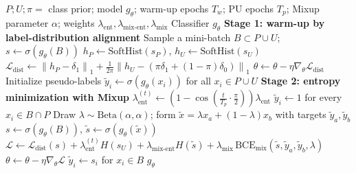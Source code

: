 \documentclass{article}
\begin{document}
\begin{algorithm}[!h]
\renewcommand{\algorithmicrequire}{\textbf{Input:}} %
\renewcommand{\algorithmicensure}{\textbf{Output:}} %
	\caption{Dist-PU (label distribution alignment for PU learning)} %
	\begin{algorithmic}[1] %
	    \REQUIRE
	    $P;U;\pi=$ class prior; model $g_{\theta}$; warm-up epochs $T_{w}$; PU epochs $T_{p}$;
	    Mixup parameter $\alpha$; weights $\lambda_{\mathrm{ent}},\lambda_{\mathrm{mix\text{-}ent}},\lambda_{\mathrm{mix}}$
	    \ENSURE
	    Classifier $g_{\theta}$
	    \STATE \textbf{Stage 1: warm-up by label-distribution alignment}
	    \STATE Sample a mini-batch $B\subset P\cup U$; $s\leftarrow \sigma(g_{\theta}(B))$ %
	    \STATE $h_{P}\leftarrow \mathrm{SoftHist}(s_{P})$, $h_{U}\leftarrow \mathrm{SoftHist}(s_{U})$ %
	    \STATE $\mathcal{L}_{\mathrm{dist}}\leftarrow \left\|h_{P}-\delta_{1}\right\|_{1}+\tfrac{1}{2\pi}\left\|h_{U}-\left(\pi\delta_{1}+(1-\pi)\delta_{0}\right)\right\|_{1}$ %
	    \STATE $\theta\leftarrow \theta-\eta\nabla_{\theta}\mathcal{L}_{\mathrm{dist}}$
	    \ENDFOR
	    \STATE Initialize pseudo-labels $\tilde{y}_{i}\leftarrow \sigma(g_{\theta}(x_{i}))$ for all $x_{i}\in P\cup U$
	    \STATE \textbf{Stage 2: entropy minimization with Mixup}
	    \STATE $\lambda_{\mathrm{ent}}^{(t)}\leftarrow \left(1-\cos\left(\tfrac{t}{T_{p}}\cdot\tfrac{\pi}{2}\right)\right)\lambda_{\mathrm{ent}}$ %
	    \STATE $\tilde{y}_{i}\leftarrow 1$ for every $x_{i}\in B\cap P$ %
	    \STATE Draw $\lambda\sim \mathrm{Beta}(\alpha,\alpha)$; form $\tilde{x}=\lambda x_{a}+(1-\lambda)x_{b}$ with targets $\tilde{y}_{a},\tilde{y}_{b}$
	    \STATE $s\leftarrow \sigma(g_{\theta}(B))$, $\tilde{s}\leftarrow \sigma(g_{\theta}(\tilde{x}))$
	    \STATE $\mathcal{L}\leftarrow \mathcal{L}_{\mathrm{dist}}(s)+\lambda_{\mathrm{ent}}^{(t)}H(s_{U})+\lambda_{\mathrm{mix\text{-}ent}}H(\tilde{s})+\lambda_{\mathrm{mix}}\,\mathrm{BCE}_{\mathrm{mix}}(\tilde{s},\tilde{y}_{a},\tilde{y}_{b},\lambda)$
	    \STATE $\theta\leftarrow \theta-\eta\nabla_{\theta}\mathcal{L}$
	    \STATE $\tilde{y}_{i}\leftarrow s_{i}$ for $x_{i}\in B$ %
	    \ENDFOR
	    \ENDFOR
		\RETURN $g_{\theta}$
	\end{algorithmic}
\end{algorithm}
\end{document}

